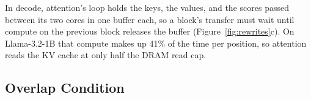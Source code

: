 In decode, attention's loop holds the keys, the values, and the scores passed between its two cores in one buffer each, so a block's transfer must wait until compute on the previous block releases the buffer (Figure~\ref{fig:rewrites}c).
On Llama-3.2-1B that compute makes up 41\% of the time per position, so attention reads the KV cache at only half the DRAM read cap.

\subsection{Overlap Condition}
\label{subsec:question}

